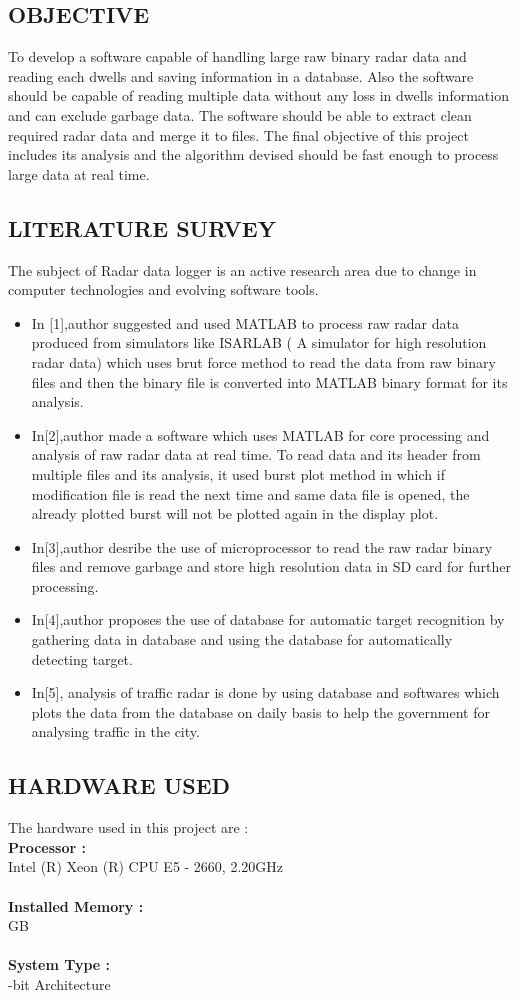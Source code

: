 \documentclass[14pt]{article} %
\begin{document}
\subsection{OBJECTIVE}
 To develop a software capable of handling large raw binary radar data and reading each dwells and saving information in a database. Also the software should be capable of reading multiple data without any loss in dwells information and can exclude garbage data. The software should be able to extract clean required radar data and merge it to files. The final objective of this project includes its analysis and the algorithm devised should be fast enough to process large data at real time. 
 \subsection{LITERATURE SURVEY}
 The subject of Radar data logger is an active research area due to change in computer technologies and evolving software tools.
 \begin{itemize}
 \item In [1],author suggested and used MATLAB to process raw radar data produced from simulators like ISARLAB ( A simulator for high resolution radar data) which uses brut force method to read the data from raw binary files and then the binary file is converted into MATLAB binary format for its analysis.
 \item In[2],author made a software which uses MATLAB for core processing and analysis of raw radar data at real time. To read data and its header from multiple files and its analysis, it used burst plot method in which if modification file is read the next time and same data file is opened, the already plotted burst will not be plotted again in the display plot.
 \item In[3],author desribe the use of microprocessor to read the raw radar binary files and remove garbage and store high resolution data in SD card for further processing.
 \item In[4],author proposes the use of database for automatic target recognition by gathering data in database and using the database for automatically detecting target.
 \item In[5], analysis of traffic radar is done by using database and softwares which plots the data from the database on daily basis to help the government for analysing traffic in the city.
 \end{itemize}

\subsection{HARDWARE USED}
\noindent The hardware used in this project are :\\
\textbf{Processor : } \\
\indent Intel (R) Xeon (R) CPU E5 - 2660, 2.20GHz\\
\\ \textbf{Installed Memory : }\\
 GB\\
\\ \textbf{System Type : }\\
 -bit Architecture
 
\end{document}
